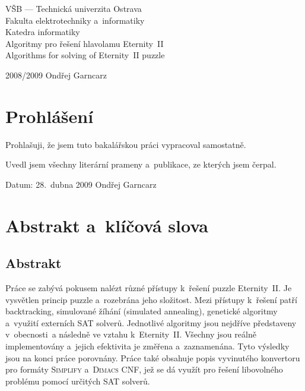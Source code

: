 \documentclass[11pt, titlepage]{report}
\begin{document}
\sloppy

\begin{titlepage}
\centering
\begin{huge}
\begin{bfseries}
VŠB --- Technická univerzita Ostrava\\
Fakulta elektrotechniky a~informatiky\\
Katedra informatiky\\
\vfill
Algoritmy pro řešení hlavolamu Eternity~II\\
Algorithms for solving of Eternity~II puzzle\\
\vfill
\end{bfseries}
\end{huge}
2008/2009
\hfill
Ondřej Garncarz
\end{titlepage}


\chapter*{Prohlášení}
\thispagestyle{empty}

\noindent Prohlašuji, že jsem tuto bakalářskou práci vypracoval samostatně.

\noindent Uvedl jsem všechny literární prameny a~publikace, ze kterých jsem čerpal.

\vskip 5cm

\noindent Datum: 28.~dubna 2009
\linewidth
Ondřej Garncarz


\chapter*{Abstrakt a~klíčová slova}
\thispagestyle{empty}

\section*{Abstrakt}

\noindent Práce se zabývá pokusem nalézt různé přístupy k~řešení puzzle Eternity~II. Je vysvětlen princip puzzle a~rozebrána jeho složitost. Mezi přístupy k~řešení patří backtracking, simulované žíhání (simulated annealing), genetické algoritmy a~využití externích SAT solverů. Jednotlivé algoritmy jsou nejdříve představeny v~obecnosti~a následně ve vztahu k~Eternity~II. Všechny jsou reálně implementovány a~jejich efektivita je změřena a~zaznamenána. Tyto výsledky jsou na konci práce porovnány. Práce také obsahuje popis vyvinutého konvertoru pro formáty \textsc{Simplify} a~\textsc{Dimacs CNF}, jež se dá využít pro řešení libovolného problému pomocí určitých SAT solverů.
\end{document}
